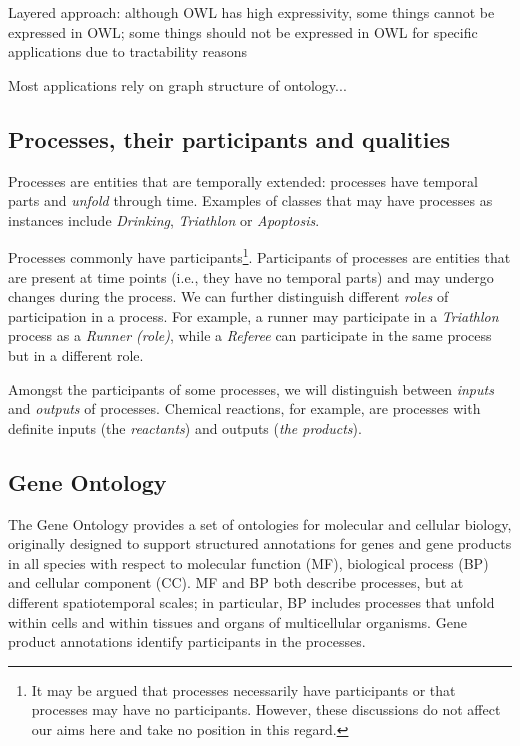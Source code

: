 \documentclass{bioinfo}
\begin{document}
Layered approach: although OWL has high expressivity, some things
cannot be expressed in OWL; some things should not be expressed in OWL
for specific applications due to tractability reasons

Most applications rely on graph structure of ontology...

\subsection{Processes, their participants and qualities}
Processes are entities that are temporally extended: processes have
temporal parts and {\em unfold} through time. Examples of classes that
may have processes as instances include {\em Drinking}, {\em
  Triathlon} or {\em Apoptosis}.

Processes commonly have participants\footnote{It may be argued that
  processes necessarily have participants or that processes may have
  no participants. However, these discussions do not affect our aims
  here and take no position in this regard.}. Participants of
processes are entities that are present at time points (i.e., they
have no temporal parts) and may undergo changes during the process.
We can further distinguish different {\em roles} of participation in a
process. For example, a runner may participate in a {\em Triathlon}
process as a {\em Runner (role)}, while a {\em Referee} can
participate in the same process but in a different role.

Amongst the participants of some processes, we will distinguish
between {\em inputs} and {\em outputs} of processes. Chemical
reactions, for example, are processes with definite inputs (the {\em
  reactants}) and outputs ({\em the products}).

\subsection{Gene Ontology}

The Gene Ontology provides a set of ontologies for molecular and
cellular biology, originally designed to support structured
annotations for genes and gene products in all species with respect to
molecular function (MF), biological process (BP) and cellular
component (CC). MF and BP both describe processes, but at different
spatiotemporal scales; in particular, BP includes processes that
unfold within cells and within tissues and organs of multicellular
organisms. Gene product annotations identify participants in the
processes.
\end{document}
